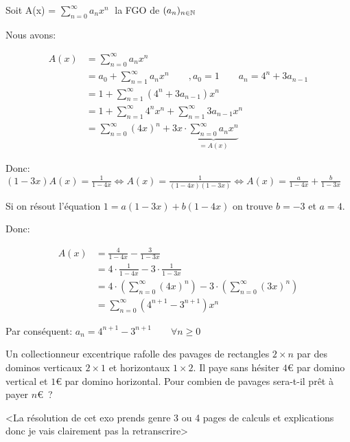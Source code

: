 Soit A(x) = $\sum_{n=0}^{\infty} a_n x^n \;$ la FGO de $(a_n)_{n\in \mathbb{N}}$

Nous avons:

\begin{align*}
A(x) &= \sum_{n=0}^{\infty} a_n x^n \\
	&= a_0 + \sum_{n=1}^{\infty} a_n x^n \qquad,a_0 = 1 \qquad a_n = 4^n + 3a_{n-1} \\
	&= 1 + \sum_{n=1}^{\infty} (4^n + 3a_{n-1}) x^n \\
	&= 1 + \sum_{n=1}^{\infty} 4^n x^n + \sum_{n=1}^{\infty} 3a_{n-1} x^n \\
	&= \sum_{n=0}^{\infty} (4x)^n + 3x \cdot \underbrace{\sum_{n=0}^{\infty} a_n x^n}_{=A(x)}
\end{align*}

Donc: $ (1-3x)A(x) = \frac{1}{1-4x} \Leftrightarrow A(x) = \frac{1}{(1-4x)(1-3x)} \Leftrightarrow A(x) = \frac{a}{1-4x} + \frac{b}{1-3x} $

Si on résout l'équation $1 = a(1-3x) + b(1-4x)$ on trouve $b = -3$ et $a = 4$. 

Donc: 

\begin{align*}
A(x) &= \frac{4}{1-4x} - \frac{3}{1-3x} \\
	&= 4 \cdot \frac{1}{1-4x} - 3 \cdot \frac{1}{1-3x}\\
	&= 4 \cdot ( \sum_{n=0}^{\infty} (4x)^n ) - 3 \cdot ( \sum_{n=0}^{\infty} (3x)^n ) \\
	&= \sum_{n=0}^{\infty} (4^{n+1} - 3^{n+1}) x^n
\end{align*}

Par conséquent: $a_n = 4^{n+1} - 3^{n+1} \qquad \forall n \geq 0$

\newpage

\begin{exo}
Un collectionneur excentrique rafolle des pavages de rectangles $2 \times n$ par des dominos verticaux $2 \times 1$ et horizontaux $1 \times 2$. Il paye sans h\'esiter $4$\euro{} par domino vertical et $1$\euro{} par domino horizontal. Pour combien de pavages sera-t-il pr\^et \`a payer $n$\euro~?
\end{exo}


<La résolution de cet exo prends genre 3 ou 4 pages de calculs et explications donc je vais clairement pas la retranscrire>
